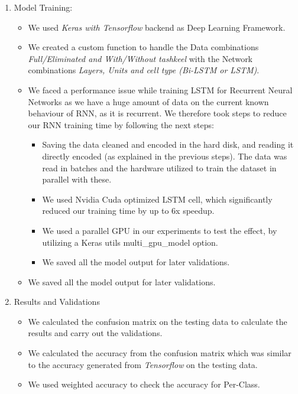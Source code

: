 {\begin{enumerate}
 \item Model Training:
 \begin{itemize}
 \item We used \textit{Keras with Tensorflow} backend as Deep Learning Framework.
 \item We created a custom function to handle the Data combinations \textit{Full/Eliminated and With/Without \textit{tashkeel}} with the Network combinations \textit{Layers, Units and cell type (Bi-LSTM or LSTM)}.

 \item We faced a performance issue while training LSTM for Recurrent Neural Networks as we have a huge amount of data on the current known behaviour of RNN, as it is recurrent. We therefore took steps to reduce our RNN training time by following the next steps:
 \begin{itemize}
  \item Saving the data cleaned and encoded in the hard disk, and reading it directly encoded (as explained in the previous steps). The data was read in batches and the hardware utilized to train the dataset in parallel with these.
  \item We used Nvidia Cuda optimized LSTM cell, which significantly reduced our training time by up to 6x speedup.
  \item We used a parallel GPU in our experiments to test the effect, by utilizing a Keras utils multi_gpu_model option.
  \item We saved all the model output for later validations.
 \end{itemize}
 \item We saved all the model output for later validations.

 \end{itemize} 

 \item Results and Validations
 \begin{itemize}
 \item We calculated the confusion matrix on the testing data to calculate the results and carry out the validations.
 \item We calculated the accuracy from the confusion matrix which was similar to the accuracy generated from \textit{Tensorflow} on the testing data.
 \item We used weighted accuracy to check the accuracy for Per-Class.

 \end{itemize}
 

\end{enumerate}}
